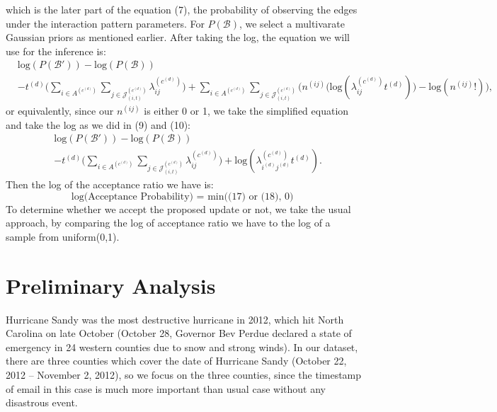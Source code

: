 \documentclass[a4paper]{article}
\begin{document}
which is the later part of the equation (7), the probability of observing the edges under the interaction pattern parameters. For $P(\mathcal{B})$, we select a multivarate Gaussian priors as mentioned earlier. After taking the log, the equation we will use for the inference is:
\begin{equation}
\begin{aligned} 
&\mbox{log}(P(\mathcal{B'}))-\mbox{log}(P(\mathcal{B}))\\&-t^{(d)}\big(\sum\limits_{i \in A^{(c^{(d)})}}\sum\limits_{j\in \mathcal{J}^{(c^{(d)})}_{(i, t)}}\lambda_{ij}^{(c^{(d)})}\big)+\sum_{i \in A^{(c^{(d)})}}\sum_{j\in \mathcal{J}^{(c^{(d)})}_{(i, t)}}\Big(n^{(ij)}\big(\mbox{log}(\lambda_{ij}^{(c^{(d)})}t^{(d)})\big)-\mbox{log}(n^{(ij)}!)\Big), 
\end{aligned}
\end{equation}
or equivalently, since our $n^{(ij)}$ is either 0 or 1, we take the simplified equation and take the log as we did in (9) and (10):
\begin{equation}
\begin{aligned} 
&\mbox{log}(P(\mathcal{B'}))-\mbox{log}(P(\mathcal{B}))\\&-t^{(d)}\big(\sum\limits_{i \in A^{(c^{(d)})}}\sum\limits_{j\in \mathcal{J}^{(c^{(d)})}_{(i, t)}}\lambda_{ij}^{(c^{(d)})}\big)+\mbox{log}(\lambda_{i^{(d)}j^{(d)}}^{(c^{(d)})}t^{(d)}). 
\end{aligned}
\end{equation}
Then the log of the acceptance ratio we have is:
\begin{equation}
\mbox{log(Acceptance Probability) = min((17) or (18), 0) }
\end{equation}
To determine whether we accept the proposed update or not, we take the usual approach, by comparing the log of acceptance ratio we have to the log of a sample from uniform(0,1).
\section{Preliminary Analysis}
Hurricane Sandy was the most destructive hurricane in 2012, which hit North Carolina on late October (October 28, Governor Bev Perdue declared a state of emergency in 24 western counties due to snow and strong winds). In our dataset, there are three counties which cover the date of Hurricane Sandy (October 22, 2012 – November 2, 2012), so we focus on the three counties, since the timestamp of email in this case is much more important than usual case without any disastrous event.
\end{document}
